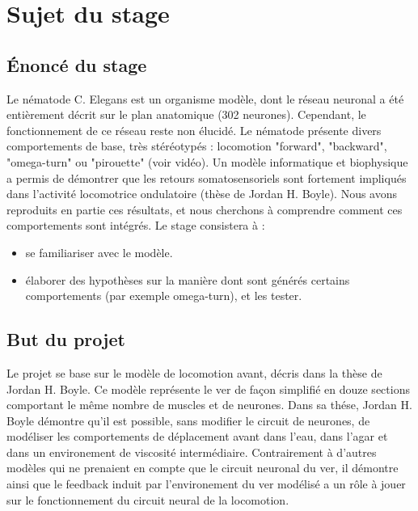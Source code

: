 \chapter{Sujet du stage} %
\label{cha:Sujet du stage}

\section{Énoncé du stage} %
\label{sec:Énoncé du stage}

Le nématode C. Elegans est un organisme modèle, dont le réseau neuronal a été entièrement décrit sur le plan
anatomique (302 neurones). Cependant, le fonctionnement de ce réseau reste non élucidé. Le nématode présente
divers comportements de base, très stéréotypés : locomotion "forward", "backward", "omega-turn" ou "pirouette"
(voir vidéo). Un modèle informatique et biophysique a permis de démontrer que les retours somatosensoriels
sont fortement impliqués dans l’activité locomotrice ondulatoire (thèse de Jordan H. Boyle). Nous avons
reproduits en partie ces résultats, et nous cherchons à comprendre comment ces comportements sont intégrés.
Le stage consistera à :
\begin{itemize}
   \item se familiariser avec le modèle.
   \item élaborer des hypothèses sur la manière dont sont générés certains comportements (par exemple
      omega-turn), et les tester.
\end{itemize}


\section{But du projet} %
\label{sec:But du projet}

Le projet se base sur le modèle de locomotion avant, décris dans la thèse de Jordan H. Boyle\cite{Boyle2009}.
Ce modèle représente le ver de façon simplifié en douze sections comportant le même nombre de muscles et de neurones.
Dans sa thése, Jordan H. Boyle démontre qu'il est possible, sans modifier le circuit de neurones, de
modéliser les comportements de déplacement avant dans l'eau, dans l'agar et dans un environement
de viscosité intermédiaire. Contrairement à d'autres modèles qui ne prenaient en compte que le circuit neuronal
du ver, il démontre ainsi que le feedback induit par l'environement du ver modélisé a un rôle à jouer sur le
fonctionnement du circuit neural de la locomotion.

